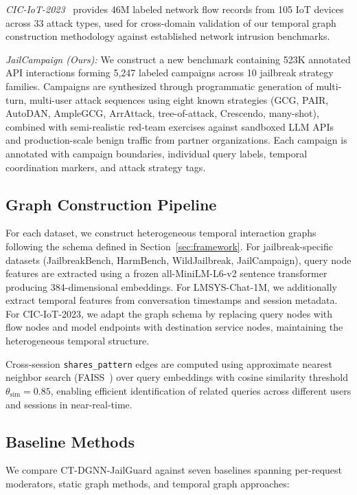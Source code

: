 \documentclass[journal]{IEEEtran}
\theoremstyle{plain}
\theoremstyle{definition}
\theoremstyle{remark}
\begin{document}
\textit{CIC-IoT-2023}~\cite{neto2023ciciot} provides 46M labeled network flow records from 105 IoT devices across 33 attack types, used for cross-domain validation of our temporal graph construction methodology against established network intrusion benchmarks.

\textit{JailCampaign (Ours):} We construct a new benchmark containing 523K annotated API interactions forming 5,247 labeled campaigns across 10 jailbreak strategy families. Campaigns are synthesized through programmatic generation of multi-turn, multi-user attack sequences using eight known strategies (GCG, PAIR, AutoDAN, AmpleGCG, ArrAttack, tree-of-attack, Crescendo, many-shot), combined with semi-realistic red-team exercises against sandboxed LLM APIs and production-scale benign traffic from partner organizations. Each campaign is annotated with campaign boundaries, individual query labels, temporal coordination markers, and attack strategy tags.

\subsection{Graph Construction Pipeline}

For each dataset, we construct heterogeneous temporal interaction graphs following the schema defined in Section~\ref{sec:framework}. For jailbreak-specific datasets (JailbreakBench, HarmBench, WildJailbreak, JailCampaign), query node features are extracted using a frozen all-MiniLM-L6-v2 sentence transformer~\cite{reimers2019sentencebert} producing 384-dimensional embeddings. For LMSYS-Chat-1M, we additionally extract temporal features from conversation timestamps and session metadata. For CIC-IoT-2023, we adapt the graph schema by replacing query nodes with flow nodes and model endpoints with destination service nodes, maintaining the heterogeneous temporal structure.

Cross-session \texttt{shares\_pattern} edges are computed using approximate nearest neighbor search (FAISS~\cite{johnson2019faiss}) over query embeddings with cosine similarity threshold $\theta_{\text{sim}} = 0.85$, enabling efficient identification of related queries across different users and sessions in near-real-time.

\subsection{Baseline Methods}

We compare CT-DGNN-JailGuard against seven baselines spanning per-request moderators, static graph methods, and temporal graph approaches:
\end{document}
